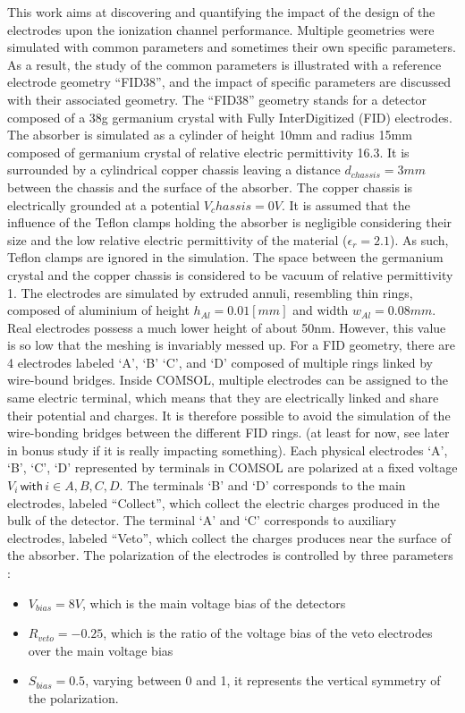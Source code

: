 This work aims at discovering and quantifying the impact of the design of the electrodes upon the ionization channel performance. Multiple geometries were simulated with common parameters and sometimes their own specific parameters. As a result, the study of the common parameters is illustrated with a reference electrode geometry “FID38”, and the impact of specific parameters are discussed with their associated geometry.
The “FID38” geometry stands for a detector composed of a 38g germanium crystal with Fully InterDigitized (FID) electrodes. The absorber is simulated as a cylinder of height 10mm and radius 15mm composed of germanium crystal of relative electric permittivity 16.3. It is surrounded by a cylindrical copper chassis leaving a distance $d_{chassis}=3mm$ between the chassis and the surface of the absorber. The copper chassis is electrically grounded at a potential $V_chassis=0V$. It is assumed that the influence of the Teflon clamps holding the absorber is negligible considering their size and the low relative electric permittivity of the material ($\epsilon_r=2.1$). As such, Teflon clamps are ignored in the simulation. The space between the germanium crystal and the copper chassis is considered to be vacuum of relative permittivity 1. The electrodes are simulated by extruded annuli, resembling thin rings, composed of aluminium of height $h_{Al}=0.01[mm]$ and width $w_{Al}=0.08mm$. Real electrodes possess a much lower height of about 50nm. However, this value is so low that the meshing is invariably messed up. For a FID geometry, there are 4 electrodes labeled ‘A’, ‘B’ ‘C’, and ‘D’ composed of multiple rings linked by wire-bound bridges. Inside COMSOL, multiple electrodes can be assigned to the same electric terminal, which means that they are electrically linked and share their potential and charges. It is therefore possible to avoid the simulation of the wire-bonding bridges between the different FID rings. (at least for now, see later in bonus study if it is really impacting something). Each physical electrodes ‘A’, ‘B’, ‘C’, ‘D’ represented by terminals in COMSOL are polarized at a fixed voltage $V_i \, \textsf{with} \, i \in {A,B,C,D}$. The terminals ‘B’ and ‘D’ corresponds to the main electrodes, labeled “Collect”, which collect the electric charges produced in the bulk of the detector. The terminal ‘A’ and ‘C’ corresponds to auxiliary electrodes, labeled “Veto”, which collect the charges produces near the surface of the absorber. The polarization of the electrodes is controlled by three parameters :
\begin{itemize}
	\item $V_{bias}=8V$, which is the main voltage bias of the detectors
	\item $R_{veto}=-0.25$, which is the ratio of the voltage bias of the veto electrodes over the main voltage bias
	\item $S_{bias}=0.5$, varying between 0 and 1, it represents the vertical symmetry of the polarization.
\end{itemize}
